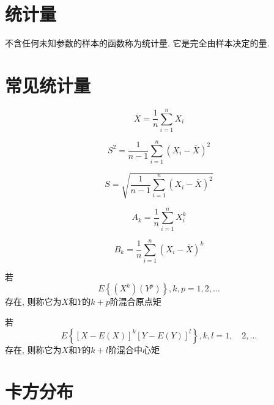\section{统计量}

不含任何未知参数的样本的函数称为统计量.
它是完全由样本决定的量.

\section{常见统计量}

\begin{definition}[样本平均值]
    $$\overline{X}=\frac{1}{n} \sum_{i=1}^{n} X_{i}$$
\end{definition}

\begin{definition}[样本方差]
    $$S^{2}=\frac{1}{ n-1} \sum_{i=1}^{n}\left(X_{i}-\bar{X}\right)^{2}$$
\end{definition}

\begin{definition}[样本标准差]
    $$S=\sqrt{\frac{1}{ { n-1} } \sum_{i=1}^{n}\left(X_{i}-\bar{X}\right)^{2}}$$
\end{definition}

\begin{definition}[样本 $k$ 阶原点矩]
    $$A_{k}=\frac{1}{n} \sum_{i=1}^{n} X_{i}^{k}$$
\end{definition}

\begin{definition}[样本 $k$ 阶中心矩]
    $${B}_{{k}}=\frac{1}{{n}} \sum_{i=1}^{n}\left({X}_{i}-\overline{{X}}\right)^{k}$$
\end{definition}

\begin{definition}[$X$和$Y$的$k+p$阶混合原点矩]
    若
    $$E \left\{\left(X^ k\right)\left(Y^ p\right)\right\}, k, p=1,2, \ldots $$
    存在, 则称它为$X$和$Y$的$k+p$阶混合原点矩
\end{definition}

\begin{definition}[$X$和$Y$的$k+l$阶混合中心矩]
    若
    $$ E\left\{[X-E(X)]^ k[Y-E(Y)]^l \right\},  k,l=1, \quad 2, \ldots $$
    存在, 则称它为$X$和$Y$的$k+l$阶混合中心矩
\end{definition}



\section{卡方分布}

